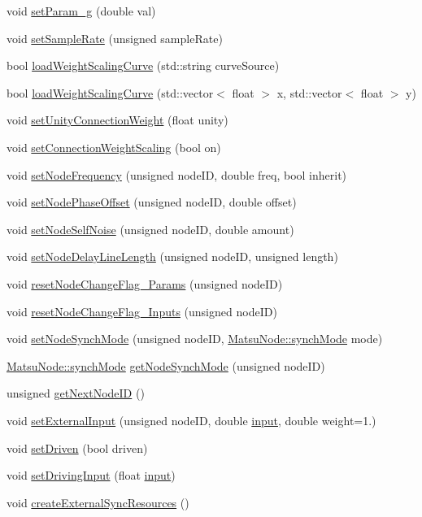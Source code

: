 \begin{DoxyCompactItemize}
\item 
void \hyperlink{classCPG_ae62c8cdcb43ab515477ca5fcac94f5e1}{set\+Param\+\_\+g} (double val)
\item 
void \hyperlink{classCPG_af2a9107312b1344e19d2aca96a2da4c2}{set\+Sample\+Rate} (unsigned sample\+Rate)
\item 
bool \hyperlink{classCPG_a61c0a3f2278d4a1db88d1d5a7dd0771f}{load\+Weight\+Scaling\+Curve} (std\+::string curve\+Source)
\item 
bool \hyperlink{classCPG_a8e1cb030a864fc7aecbe9e394b0b6e03}{load\+Weight\+Scaling\+Curve} (std\+::vector$<$ float $>$ x, std\+::vector$<$ float $>$ y)
\item 
void \hyperlink{classCPG_a3ba255f2cd3577c5bab856b71169b445}{set\+Unity\+Connection\+Weight} (float unity)
\item 
void \hyperlink{classCPG_a78a7b481668202d413e5630f5803da3c}{set\+Connection\+Weight\+Scaling} (bool on)
\item 
void \hyperlink{classCPG_a6c8b0a674e597f7559033339621baba9}{set\+Node\+Frequency} (unsigned node\+ID, double freq, bool inherit)
\item 
void \hyperlink{classCPG_a6333bf3b624bd2742384ddea032a885f}{set\+Node\+Phase\+Offset} (unsigned node\+ID, double offset)
\item 
void \hyperlink{classCPG_aec5c18fe5931482820d203e8e190eefe}{set\+Node\+Self\+Noise} (unsigned node\+ID, double amount)
\item 
void \hyperlink{classCPG_a79f22916b43191ac6a5be7f5cbe185e4}{set\+Node\+Delay\+Line\+Length} (unsigned node\+ID, unsigned length)
\item 
void \hyperlink{classCPG_a4bc2674914fb92eddb4cb0e67562cb64}{reset\+Node\+Change\+Flag\+\_\+\+Params} (unsigned node\+ID)
\item 
void \hyperlink{classCPG_a8523c6ee51d46aad0bd07c45090e8de3}{reset\+Node\+Change\+Flag\+\_\+\+Inputs} (unsigned node\+ID)
\item 
void \hyperlink{classCPG_ad237f2dc49f5340b056cff42100af751}{set\+Node\+Synch\+Mode} (unsigned node\+ID, \hyperlink{classMatsuNode_a725e228db39b8842f851ddf88f640bed}{Matsu\+Node\+::synch\+Mode} mode)
\item 
\hyperlink{classMatsuNode_a725e228db39b8842f851ddf88f640bed}{Matsu\+Node\+::synch\+Mode} \hyperlink{classCPG_a90390492d725a180160ee2743619fd27}{get\+Node\+Synch\+Mode} (unsigned node\+ID)
\item 
unsigned \hyperlink{classCPG_aa36545f77f1e3b6161bb00ff525ddc12}{get\+Next\+Node\+ID} ()
\item 
void \hyperlink{classCPG_add4b14085a01274b19b7a599d2f02af4}{set\+External\+Input} (unsigned node\+ID, double \hyperlink{structCPG_1_1input}{input}, double weight=1.)
\item 
void \hyperlink{classCPG_a71cc2187f75bf57bc050d95cce839812}{set\+Driven} (bool driven)
\item 
void \hyperlink{classCPG_a82ef88ef37a52bd2503c74752c833b29}{set\+Driving\+Input} (float \hyperlink{structCPG_1_1input}{input})
\item 
void \hyperlink{classCPG_af934e459315109d3c206781bccef997b}{create\+External\+Sync\+Resources} ()
\end{DoxyCompactItemize}


